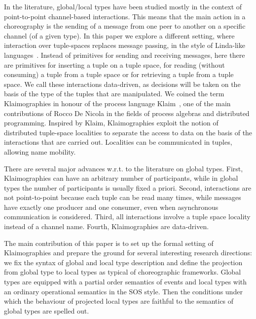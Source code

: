 In the literature, global/local types have been studied mostly in the
context of point-to-point channel-based interactions. This means that
the main action in a choreography is the sending of a message from one
peer to another on a specific channel (of a given type). In this paper we
explore a different setting, where interaction over tuple-spaces
replaces message passing, in the style of Linda-like
languages~\cite{DBLP:journals/toplas/Gelernter85}.  Instead of
primitives for sending and receiving messages, here there are
primitives for inserting a tuple on a tuple space, for reading
(without consuming) a tuple from a tuple space or for retrieving a
tuple from a tuple space. We call these interactions data-driven, as
decisions will be taken on the basis of the type of the tuples that
are manipulated. We coined the term Klaimographies in honour of the
process language Klaim~\cite{DBLP:journals/tse/NicolaFP98,klaim}, one
of the main contributions of Rocco De Nicola in the fields of process
algebras and distributed programming. Inspired by Klaim,
Klaimographies exploit the notion of distributed tuple-space
localities to separate the access to data on the basis of the
interactions that are carried out. Localities can be communicated in
tuples, allowing name mobility.

There are several major advances w.r.t. to the literature on global types.
First, Klaimographies can have an arbitrary number of participants, while in global types the number of participants is usually fixed a priori.
Second, interactions are not point-to-point because each tuple can be read many times, while messages have exactly one producer and one consumer, even when asynchronous communication is considered.
Third, all interactions involve a tuple space locality instead of a channel name.
Fourth, Klaimographies are data-driven.

The main contribution of this paper is to set up the formal setting of Klaimographies and prepare the ground for several interesting research directions: we fix the syntax of global and local type description and define the projection from global type to local types as typical of choreographic frameworks.
Global types are equipped with a partial order semantics of events and local types with an ordinary operational semantics in the SOS style. Then the conditions under which the behaviour of projected local types are faithful to the semantics of global types are spelled out. 

